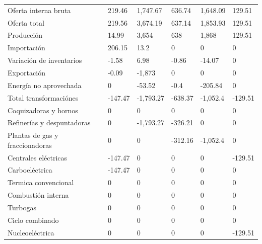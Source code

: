 \documentclass{sener2025}
\begin{document}
\begin{tabladoradoLargo}
\begin{xltabular}{\textwidth}{YZZZZZ}
    Oferta interna bruta & 219.46 & 1,747.67 & 636.74 & 1,648.09 & 129.51 \\
    \hspace{1.35em} Oferta total & 219.56 & 3,674.19 & 637.14 & 1,853.93 & 129.51 \\
    \hspace{2.7em} Producción & 14.99 & 3,654 & 638 & 1,868 & 129.51 \\
    \hspace{2.7em} Importación & 206.15 & 13.2 & 0 & 0 & 0 \\
    \hspace{2.7em} Variación de inventarios & -1.58 & 6.98 & -0.86 & -14.07 & 0 \\
    \hspace{1.35em} Exportación & -0.09 & -1,873 & 0 & 0 & 0 \\
    \hspace{1.35em} Energía no aprovechada & 0 & -53.52 & -0.4 & -205.84 & 0 \\
    Total transformaciónes & -147.47 & -1,793.27 & -638.37 & -1,052.4 & -129.51 \\
    \hspace{1.35em} Coquizadoras y hornos & 0 & 0 & 0 & 0 & 0 \\
    \hspace{1.35em} Refinerías y despuntadoras & 0 & -1,793.27 & -326.21 & 0 & 0 \\
    \hspace{1.35em} Plantas de gas y fraccionadoras & 0 & 0 & -312.16 & -1,052.4 & 0 \\
    \hspace{1.35em} Centrales eléctricas & -147.47 & 0 & 0 & 0 & -129.51 \\
    \hspace{2.7em} Carboeléctrica & -147.47 & 0 & 0 & 0 & 0 \\
    \hspace{2.7em} Termica convencional & 0 & 0 & 0 & 0 & 0 \\
    \hspace{2.7em} Combustión interna & 0 & 0 & 0 & 0 & 0 \\
    \hspace{2.7em} Turbogas & 0 & 0 & 0 & 0 & 0 \\
    \hspace{2.7em} Ciclo combinado & 0 & 0 & 0 & 0 & 0 \\
    \hspace{2.7em} Nucleoeléctrica & 0 & 0 & 0 & 0 & -129.51 \\

\end{xltabular}
\end{tabladoradoLargo}
\end{document}
